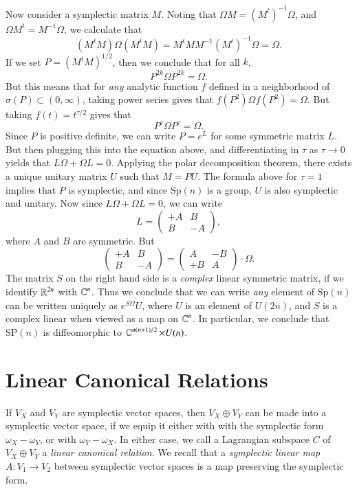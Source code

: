 Now consider a symplectic matrix $M$. Noting that $\Omega M = (M^t)^{-1} \Omega$, and $\Omega M^t = M^{-1} \Omega$, we calculate that
%
\[ (M^t M) \Omega (M^t M) = M^t M M^{-1} (M^t)^{-1} \Omega = \Omega. \]
%
If we set $P = (M^t M)^{1/2}$, then we conclude that for all $k$,
%
\[ P^{2k} \Omega P^{2k} = \Omega. \]
%
But this means that for \emph{any} analytic function $f$ defined in a neighborhood of $\sigma(P) \subset (0,\infty)$, taking power series gives that $f(P^2) \Omega f(P^2) = \Omega$. But taking $f(t) = t^{\tau / 2}$ gives that
%
\[ P^\tau \Omega P^\tau = \Omega. \]
%
Since $P$ is positive definite, we can write $P = e^L$ for some symmetric matrix $L$. But then plugging this into the equation above, and differentiating in $\tau$ as $\tau \to 0$ yields that $L \Omega + \Omega L = 0$. Applying the polar decomposition theorem, there exists a unique unitary matrix $U$ such that $M = PU$. The formula above for $\tau = 1$ implies that $P$ is symplectic, and since $\text{Sp}(n)$ is a group, $U$ is also symplectic and unitary. Now since $L \Omega + \Omega L = 0$, we can write
%
\[ L = \begin{pmatrix} +A & B \\ B & -A \end{pmatrix}, \]
%
where $A$ and $B$ are symmetric. But
%
\[ \begin{pmatrix} +A & B \\ B & -A \end{pmatrix} = \begin{pmatrix} A & -B \\ +B & A \end{pmatrix} \cdot \Omega. \]
%
The matrix $S$ on the right hand side is a \emph{complex} linear symmetric matrix, if we identify $\operatorname{\mathbb{R}}^{2n}$ with $\operatorname{\mathbb{C}}^n$. Thus we conclude that we can write \emph{any} element of $\text{Sp}(n)$ can be written uniquely as $e^{S \Omega} U$, where $U$ is an element of $U(2n)$, and $S$ is a complex linear when viewed as a map on $\operatorname{\mathbb{C}}^n$. In particular, we conclude that $\text{SP}(n)$ is diffeomorphic to $\operatorname{\mathbb{C}}^{n(n+1)/2} \times U(n)$.

\section{Linear Canonical Relations}

If $V_X$ and $V_Y$ are symplectic vector spaces, then $V_X \oplus V_Y$ can be made into a symplectic vector space, if we equip it either with with the symplectic form $\omega_X - \omega_Y$, or with $\omega_Y - \omega_X$. In either case, we call a Lagrangian subspace $C$ of $V_X \oplus V_Y$ a \emph{linear canonical relation}. We recall that a \emph{symplectic linear map} $A: V_1 \to V_2$ between symplectic vector spaces is a map preserving the symplectic form.

